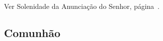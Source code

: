 \begin{rubrica}
  Ver Solenidade da Anunciação do Senhor, página~\pageref{subsection:proprium-sanctorum/in-annuntiatione-domini/offertorium}.
\end{rubrica}

\AllowPageFlush

\subsection{Comunhão}\label{subsection:proprium-sanctorum/in-assumptione-bmv/communio}
